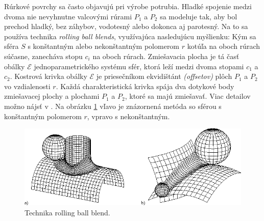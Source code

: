 Rúrkové povrchy sa často objavujú pri výrobe potrubia. Hladké spojenie medzi dvoma nie nevyhnutne valcovými rúrami $P_1$ a $P_2$ sa modeluje tak, aby bol prechod hladký, bez záhybov, vodotesný alebo dokonca aj parotesný. Na to sa používa technika \textit{rolling ball blends}, využívajúca nasledujúcu myšlienku: Kým sa sféra $S$ s konštantným alebo nekonštantným polomerom $r$ kotúľa na oboch rúrach súčasne, zanecháva stopu $c_i$ na oboch rúrach. Zmiešavacia plocha je tá časť obálky $\mathcal{E}$ jednoparametrického systému sfér, ktorá leží medzi dvoma stopami $c_1$ a $c_2$. Kostrová krivka obálky $\mathcal{E}$ je priesečníkom ekvidištánt \textit{(offsetov)} plôch $P_1$ a $P_2$ vo vzdialenosti $r$. Každá charakteristická krivka spája dva dotykové body zmiešavacej plochy a plochami $P_1$ a $P_2$, ktoré sa majú zmiešavať. Viac detailov možno nájsť v \cite{Ode20}. Na obrázku \ref{fig:rolling_ball_blends} vľavo je znázornená metóda so sférou s konštantným polomerom $r$, vpravo s nekonštantným.

\begin{figure}[H]
	\centering
	\includegraphics[width=\textwidth]{images/rolling_ball_blends.png}
	\caption{Technika rolling ball blend.}
	\label{fig:rolling_ball_blends}
\end{figure}

